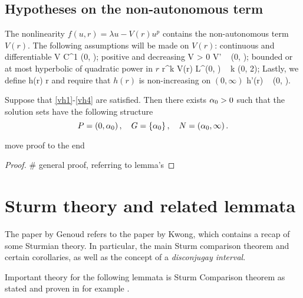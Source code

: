 \subsection{Hypotheses on the non-autonomous term}
The nonlinearity $f(u, r) = \lambda u - V(r) u^p$ contains the non-autonomous
term $V(r)$. The following assumptions will be made on $V(r)$: continuous and
differentiable
\be \label{vh1} 
    V \in C^1 (0, \infty); 
\ee
positive and decreasing
\be \label{vh2} 
    V > 0 \quad {} \quad V'  \quad {} ~ (0, \infty);
\ee
bounded or at most hyperbolic of quadratic power in $r$
\be \label{vh3}
    r^k V(r) \in L^\infty (0, \infty) \quad {} ~ k \in (0, 2);
\ee
Lastly, we define
\be \label{hdef} h(r) \coloneqq r  \ee
and require that $h(r)$ is non-increasing on $(0, \infty)$ 
\be \label{vh4} h'(r)  \quad {} ~ (0, \infty). \ee

\begin{theorem}
Suppose that \eqref{vh1}-\eqref{vh4} are satisfied. Then there exists $\alpha_0>0$ such
that the solution sets have the following structure
\[
P = \left( 0, \alpha_0 \right), \quad G = \left\{ \alpha_0 \right\}, \quad N =
\left( \alpha_0, \infty \right).
\]
\end{theorem}

{\red move proof to the end}
\begin{proof}
\# general proof, referring to lemma's
\end{proof}

\section{Sturm theory and related lemmata}
The paper by Genoud refers to the paper by Kwong, which contains a recap of some
Sturmian theory. In particular, the main Sturm comparison theorem and certain
corollaries, as well as the concept of a \emph{disconjugay interval}.

Important theory for the following lemmata is Sturm Comparison theorem as stated
and proven in for example \cite{kwong}.



